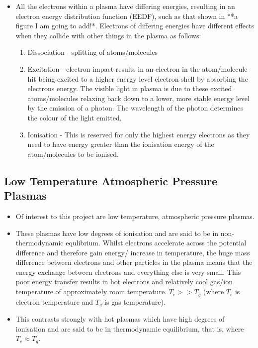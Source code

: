 \documentclass[11pt, oneside]{article}   	%
\begin{document}
\begin{itemize}
\item All the electrons within a plasma have differing energies, resulting in an electron energy distribution function (EEDF), such as that shown in **a figure I am going to add!*. Electrons of differing energies have different effects when they collide with other things in the plasma as follows:
\begin{enumerate}
\item Dissociation - splitting of atoms/molecules
\item Excitation - electron impact results in an electron in the atom/molecule hit being excited to a higher energy level electron shell by absorbing the electrons energy. The visible light in plasma is due to these excited atoms/molecules relaxing back down to a lower, more stable energy level by the emission of a photon. The wavelength of the photon determines the colour of the light emitted.
\item Ionisation - This is reserved for only the highest energy electrons as they need to have energy greater than the ionisation energy of the atom/molecules to be ionised.
\end{enumerate}

\end{itemize}




\subsection{Low Temperature Atmospheric Pressure Plasmas}

\begin{itemize}

\item Of interest to this project are low temperature, atmospheric pressure plasmas.
\item These plasmas have low degrees of ionisation and are said to be in non-thermodynamic equlibrium. 
Whilst electrons accelerate across the potential difference and therefore gain energy/ increase in temperature, the huge mass difference between electrons and other particles in the plasma means that the energy exchange between electrons and everything else is very small. 
This poor energy transfer results in hot electrons and relatively cool gas/ion temperature of approximately room temperature. $T_e >> T_g$ (where $T_e$ is electron temperature and $T_g$ is gas temperature).
\item This contrasts strongly with hot plasmas which have high degrees of ionisation and are said to be in thermodynamic equilibrium, that is, where $T_e \approx T_g$.

\end{itemize}
\end{document}
